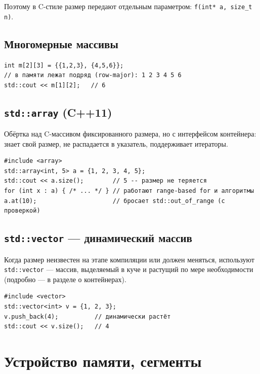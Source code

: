 Поэтому в C-стиле размер передают отдельным параметром: \texttt{f(int* a, size\_t n)}.

\subsection{Многомерные массивы}

\begin{lstlisting}
int m[2][3] = {{1,2,3}, {4,5,6}};
// в памяти лежат подряд (row-major): 1 2 3 4 5 6
std::cout << m[1][2];   // 6
\end{lstlisting}

\subsection{\texttt{std::array} (C++11)}

Обёртка над C-массивом фиксированного размера, но с интерфейсом контейнера: знает
свой размер, не распадается в указатель, поддерживает итераторы.

\begin{lstlisting}
#include <array>
std::array<int, 5> a = {1, 2, 3, 4, 5};
std::cout << a.size();        // 5 -- размер не теряется
for (int x : a) { /* ... */ } // работают range-based for и алгоритмы
a.at(10);                     // бросает std::out_of_range (с проверкой)
\end{lstlisting}

\subsection{\texttt{std::vector} --- динамический массив}

Когда размер неизвестен на этапе компиляции или должен меняться, используют
\texttt{std::vector} --- массив, выделяемый в куче и растущий по мере
необходимости (подробно --- в разделе о контейнерах).

\begin{lstlisting}
#include <vector>
std::vector<int> v = {1, 2, 3};
v.push_back(4);          // динамически растёт
std::cout << v.size();   // 4
\end{lstlisting}


\section{Устройство памяти, сегменты}

